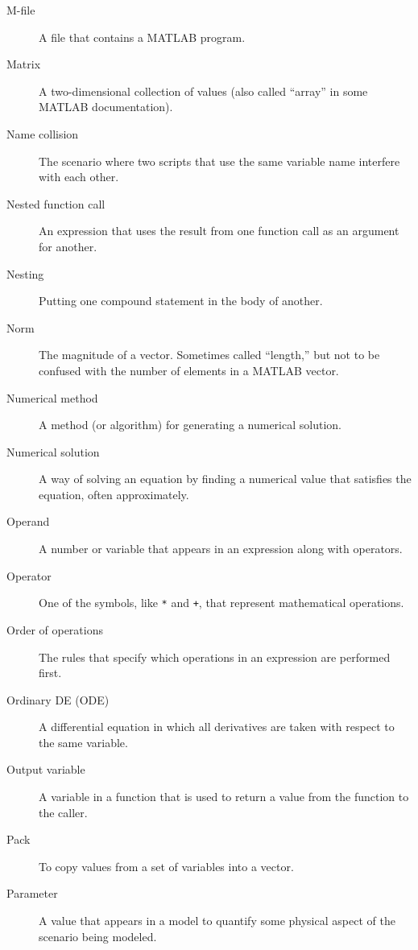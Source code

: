 \begin{description}
\item[M-file] A file that contains a MATLAB program.

\item[Matrix] A two-dimensional collection of values (also called
``array'' in some MATLAB documentation).

\item[Name collision] The scenario where two scripts that use the
same variable name interfere with each other.

\item[Nested function call] An expression that uses the result from
one function call as an argument for another.

\item[Nesting] Putting one compound statement in the body of another.

\item[Norm] The magnitude of a vector.  Sometimes called ``length,''
but not to be confused with the number of elements in a MATLAB
vector.

\item[Numerical method] A method (or algorithm) for generating
a numerical solution.

\item[Numerical solution] A way of solving an equation by finding
a numerical value that satisfies the equation, often approximately.

\item[Operand] A number or variable that appears in an expression along
with operators.

\item[Operator] One of the symbols, like \lstinline{*} and \lstinline{+}, that
represent mathematical operations.

\item[Order of operations] The rules that specify which operations
in an expression are performed first.

\item[Ordinary DE (ODE)] A differential equation in which all derivatives are taken with
respect to the same variable.

\item[Output variable] A variable in a function that is used to
return a value from the function to the caller.

\item[Pack] To copy values from a set of variables into a vector.

\item[Parameter] A value that appears in a model to quantify some
physical aspect of the scenario being modeled.


\end{description}

